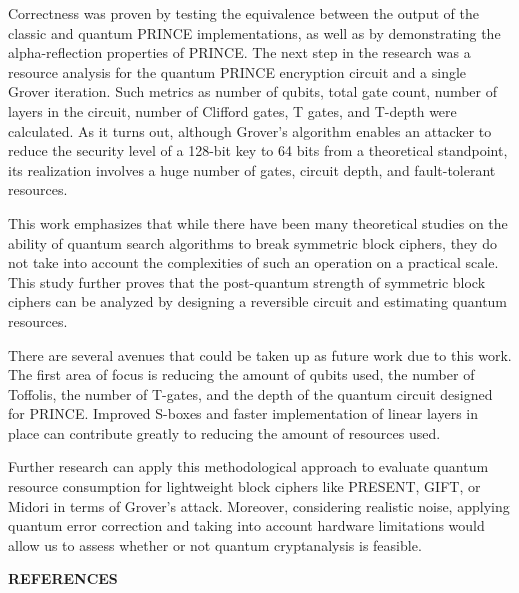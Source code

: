 \documentclass[12pt,a4paper]{report}
\begin{document}
Correctness was proven by testing the equivalence between the output of the classic and quantum PRINCE implementations, as well as by demonstrating the alpha-reflection properties of PRINCE. The next step in the research was a resource analysis for the quantum PRINCE encryption circuit and a single Grover iteration. Such metrics as number of qubits, total gate count, number of layers in the circuit, number of Clifford gates, T gates, and T-depth were calculated. As it turns out, although Grover's algorithm enables an attacker to reduce the security level of a 128-bit key to 64 bits from a theoretical standpoint, its realization involves a huge number of gates, circuit depth, and fault-tolerant resources.

This work emphasizes that while there have been many theoretical studies on the ability of quantum search algorithms to break symmetric block ciphers, they do not take into account the complexities of such an operation on a practical scale. This study further proves that the post-quantum strength of symmetric block ciphers can be analyzed by designing a reversible circuit and estimating quantum resources.

There are several avenues that could be taken up as future work due to this work. The first area of focus is reducing the amount of qubits used, the number of Toffolis, the number of T-gates, and the depth of the quantum circuit designed for PRINCE. Improved S-boxes and faster implementation of linear layers in place can contribute greatly to reducing the amount of resources used.

Further research can apply this methodological approach to evaluate quantum resource consumption for lightweight block ciphers like PRESENT, GIFT, or Midori in terms of Grover’s attack. Moreover, considering realistic noise, applying quantum error correction and taking into account hardware limitations would allow us to assess whether or not quantum cryptanalysis is feasible.

\cleardoublepage
\begin{center}
{\large \textbf{REFERENCES}}
\end{center}

\vspace{1cm}
\singlespacing
\setlength{\parskip}{0.6\baselineskip}
\end{document}
